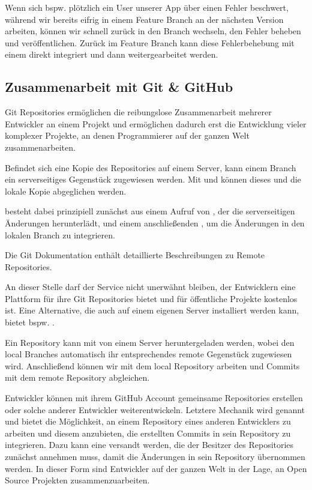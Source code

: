 \documentclass[parskip=half, final]{scrreprt}
\begin{document}
Wenn sich bspw. plötzlich ein User unserer App über einen Fehler beschwert, während wir bereits eifrig in einem Feature Branch an der nächsten Version arbeiten, können wir schnell zurück in den  Branch wechseln, den Fehler beheben und veröffentlichen. Zurück im Feature Branch kann diese Fehlerbehebung mit einem  direkt integriert und dann weitergearbeitet werden.

\subsection{Zusammenarbeit mit Git \& GitHub}

Git Repositories ermöglichen die reibungslose Zusammenarbeit mehrerer Entwickler an einem Projekt und ermöglichen dadurch erst die Entwicklung vieler komplexer Projekte, an denen Programmierer auf der ganzen Welt zusammenarbeiten.

Befindet sich eine Kopie des Repositories auf einem Server, kann einem Branch ein serverseitiges Gegenstück zugewiesen werden. Mit  und  können dieses  und die lokale Kopie abgeglichen werden.

 besteht dabei prinzipiell zunächst aus einem Aufruf von , der die serverseitigen Änderungen herunterlädt, und einem anschließenden , um die Änderungen in den lokalen Branch zu integrieren.

Die Git Dokumentation  enthält detaillierte Beschreibungen zu Remote Repositories.

An dieser Stelle darf der Service  nicht unerwähnt bleiben, der Entwicklern eine Plattform für ihre Git Repositories bietet und für öffentliche Projekte kostenlos ist. Eine Alternative, die auch auf einem eigenen Server installiert werden kann, bietet bspw. .

Ein Repository kann mit  von einem Server heruntergeladen werden, wobei den local Branches automatisch ihr entsprechendes remote Gegenstück zugewiesen wird. Anschließend können wir mit dem local Repository arbeiten und Commits mit dem remote Repository abgleichen.

Entwickler können mit ihrem GitHub Account gemeinsame Repositories erstellen oder solche anderer Entwickler weiterentwickeln. Letztere Mechanik wird  genannt und bietet die Möglichkeit, an einem Repository eines anderen Entwicklers zu arbeiten und diesem anzubieten, die erstellten Commits in sein Repository zu integrieren. Dazu kann eine  versandt werden, die der Besitzer des Repositories zunächst annehmen muss, damit die Änderungen in sein Repository übernommen werden. In dieser Form sind Entwickler auf der ganzen Welt in der Lage, an Open Source Projekten zusammenzuarbeiten.
\end{document}
